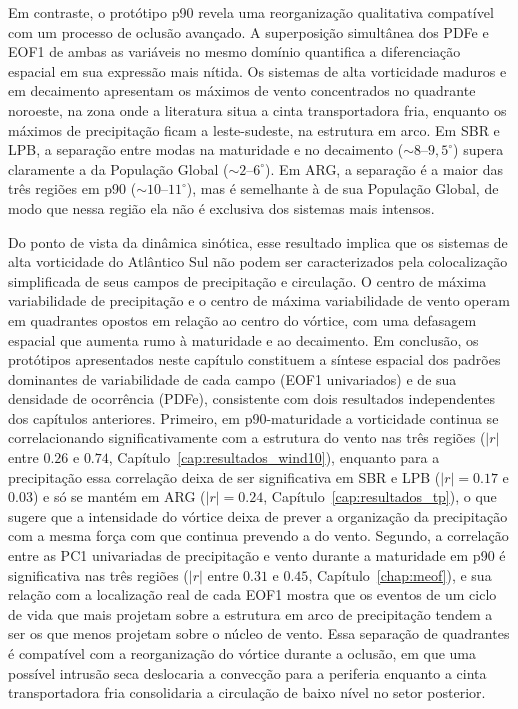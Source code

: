 Em contraste, o protótipo p90 revela uma reorganização qualitativa compatível com um processo de oclusão avançado. A superposição simultânea dos PDFe e EOF1 de ambas as variáveis no mesmo domínio quantifica a diferenciação espacial em sua expressão mais nítida. Os sistemas de alta vorticidade maduros e em decaimento apresentam os máximos de vento concentrados no quadrante noroeste, na zona onde a literatura situa a cinta transportadora fria, enquanto os máximos de precipitação ficam a leste-sudeste, na estrutura em arco. Em SBR e LPB, a separação entre modas na maturidade e no decaimento (${\sim}8$--$9{,}5^{\circ}$) supera claramente a da População Global (${\sim}2$--$6^{\circ}$). Em ARG, a separação é a maior das três regiões em p90 (${\sim}10$--$11^{\circ}$), mas é semelhante à de sua População Global, de modo que nessa região ela não é exclusiva dos sistemas mais intensos.

Do ponto de vista da dinâmica sinótica, esse resultado implica que os sistemas de alta vorticidade do Atlântico Sul não podem ser caracterizados pela colocalização simplificada de seus campos de precipitação e circulação. O centro de máxima variabilidade de precipitação e o centro de máxima variabilidade de vento operam em quadrantes opostos em relação ao centro do vórtice, com uma defasagem espacial que aumenta rumo à maturidade e ao decaimento. Em conclusão, os protótipos apresentados neste capítulo constituem a síntese espacial dos padrões dominantes de variabilidade de cada campo (EOF1 univariados) e de sua densidade de ocorrência (PDFe), consistente com dois resultados independentes dos capítulos anteriores. Primeiro, em p90-maturidade a vorticidade continua se correlacionando significativamente com a estrutura do vento nas três regiões ($|r|$ entre $0.26$ e $0.74$, Capítulo~\ref{cap:resultados_wind10}), enquanto para a precipitação essa correlação deixa de ser significativa em SBR e LPB ($|r|=0.17$ e $0.03$) e só se mantém em ARG ($|r|=0.24$, Capítulo~\ref{cap:resultados_tp}), o que sugere que a intensidade do vórtice deixa de prever a organização da precipitação com a mesma força com que continua prevendo a do vento. Segundo, a correlação entre as PC1 univariadas de precipitação e vento durante a maturidade em p90 é significativa nas três regiões ($|r|$ entre $0.31$ e $0.45$, Capítulo~\ref{chap:meof}), e sua relação com a localização real de cada EOF1 mostra que os eventos de um ciclo de vida que mais projetam sobre a estrutura em arco de precipitação tendem a ser os que menos projetam sobre o núcleo de vento. Essa separação de quadrantes é compatível com a reorganização do vórtice durante a oclusão, em que uma possível intrusão seca deslocaria a convecção para a periferia enquanto a cinta transportadora fria consolidaria a circulação de baixo nível no setor posterior.
